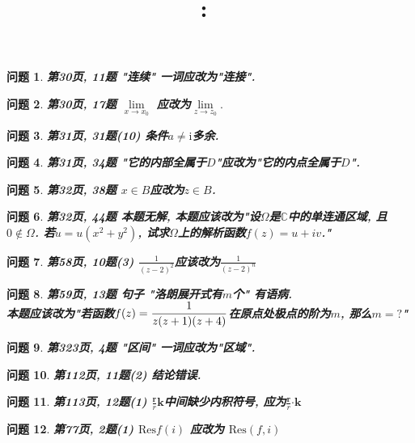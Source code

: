 \documentclass[12pt]{article}
\author{\textbf{\assignmentAuthorName}} %
\date{} %
\title{
	\thispagestyle{empty} %
	\vspace{0.2\textheight} %
	\textbf{\assignmentClass:\ \assignmentTitle}\\[-4pt]
	\ifdef{\assignmentDueDate}{{\small Due\ on\ \assignmentDueDate}\\}{} %
	\ifdef{\assignmentClassInstructor}{{\large \textit{\assignmentClassInstructor}}}{} %
	\vspace{0.32\textheight} %
}
\newcommand{\questiontext}[1]{
	\textbf{#1}
	\vspace{0.5\baselineskip} %
}
\newtheorem{prob}{\color{blue}问题}
\begin{document}
\begin{prob}
\questiontext{
	第30页, 11题 "连续" 一词应改为"连接".
}
\end{prob}

\begin{prob}
	\questiontext{
		第30页, 17题
		$\lim\limits_{x\to x_0}
		$
		应改为$
			\lim\limits_{z\to z_0}.
		$
	}
\end{prob}

\begin{prob}
	\questiontext{
		第31页, 31题(10)
		条件$a\neq \mathrm{i}$多余.
	}
\end{prob}

\begin{prob}
	\questiontext{
		第31页, 34题
		"它的内部全属于$D$"应改为"它的内点全属于$D$".
	}
\end{prob}

\begin{prob}
	\questiontext{
		第32页, 38题
		$x\in B$应改为$z\in B$.
	}
\end{prob}

\begin{prob}
	\questiontext{
		第32页, 44题
		本题无解, 本题应该改为"设$\Omega$是$\mathbb{C}$中的单连通区域, 且$0\notin \Omega$. 若$u = u(x^2+y^2)$, 试求$\Omega$上的解析函数$f(z) = u+iv$."
	}
\end{prob}


\begin{prob}
	\questiontext{%
		第58页, 10题(3)
		$\frac{1}{(z-2)^2}$应该改为$\frac{1}{(z-2)^n}$
	}
\end{prob}

\begin{prob}
	\questiontext{%
		第59页, 13题
		句子 "洛朗展开式有$m$个" 有语病.\\
		本题应该改为"若函数$\begin{lgathered}
		f(z) = \frac{1}{z(z+1)(z+4)}
		\end{lgathered}$在原点处极点的阶为$m$, 那么$m = ?$"
	}
\end{prob}

\begin{prob}
	\questiontext{%
		第323页, 4题 "区间" 一词应改为"区域".
	}
\end{prob}

\begin{prob}
	\questiontext{%
		第112页, 11题(2) 结论错误.
	}
\end{prob}

\begin{prob}
	\questiontext{%
		第113页, 12题(1) $\frac{\bm{r}}{r}\bm{k}$中间缺少内积符号, 应为$\frac{\bm{r}}{r}\bm{\cdot}\bm{k}$
	}
\end{prob}

\begin{prob}
	\questiontext{%
		第77页, 2题(1) $\mathrm{Res}f(i)$ 应改为 $\mathrm{Res}(f,i)$
	}
\end{prob}
\end{document}
